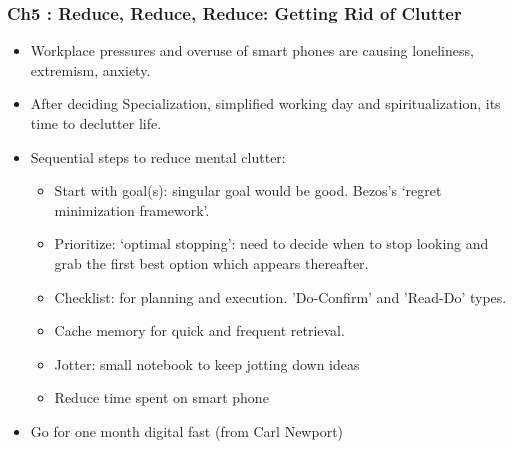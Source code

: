 \begin{frame}[fragile]\frametitle{Ch5 : Reduce, Reduce, Reduce: Getting Rid of Clutter}

\begin{itemize}
\item Workplace pressures and overuse of smart phones are causing loneliness, extremism, anxiety.
\item After deciding Specialization, simplified working day and spiritualization, its time to declutter life.
\item Sequential steps to reduce mental clutter:
	\begin{itemize}
	\item Start with goal(s): singular goal would be good. Bezos's `regret minimization framework'.
	\item Prioritize:  `optimal stopping': need to decide when to stop looking and grab the first best option which appears thereafter.
	\item Checklist: for planning and execution. 'Do-Confirm' and 'Read-Do' types.
	\item Cache memory for quick and frequent retrieval.
	\item Jotter: small notebook to keep jotting down ideas
	\item Reduce time spent on smart phone
	\end{itemize}
\item Go for one month digital fast (from Carl Newport)

\end{itemize}

\end{frame}


